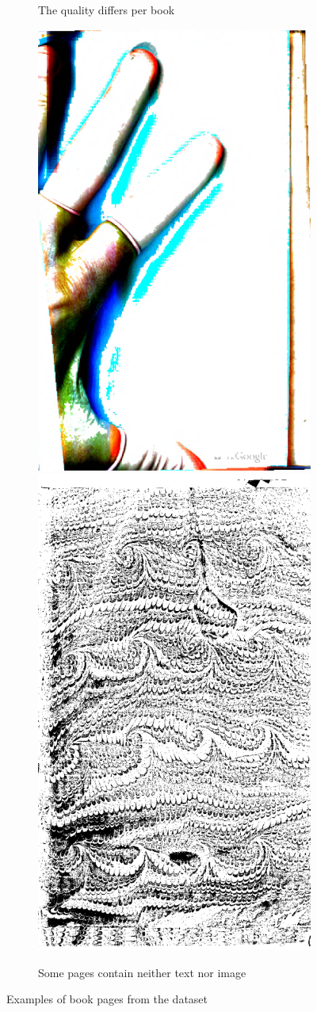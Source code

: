 \begin{figure}[H]
\begin{subfigure}[b]{0.49\textwidth}
		\caption{The quality differs per book}
		\label{fig:qualityExamples}
	\end{subfigure}
	\begin{subfigure}[b]{0.49\textwidth}
		\includegraphics[width=.49\textwidth]{resources/500_0002}
		\includegraphics[width=.49\textwidth]{resources/500_0004}
		\caption{Some pages contain neither text nor image}
		\label{fig:baggerExamples}
	\end{subfigure}
	\caption{Examples of book pages from the dataset}
	\label{fig:examples}
\end{figure}

